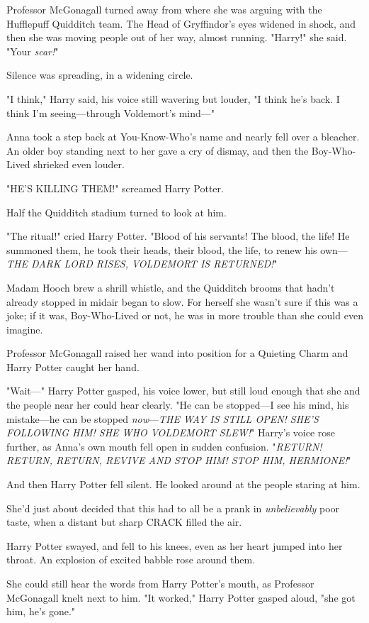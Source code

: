 Professor McGonagall turned away from where she was arguing with the Hufflepuff
Quidditch team. The Head of Gryffindor's eyes widened in shock, and then she
was moving people out of her way, almost running. "Harry!" she said. "Your
\emph{scar!}"

Silence was spreading, in a widening circle.

"I think," Harry said, his voice still wavering but louder, "I think he's back.
I think I'm seeing---through Voldemort's mind---"

Anna took a step back at You-Know-Who's name and nearly fell over a bleacher.
An older boy standing next to her gave a cry of dismay, and then the
Boy-Who-Lived shrieked even louder.

"HE'S KILLING THEM!" screamed Harry Potter.

Half the Quidditch stadium turned to look at him.

"The ritual!" cried Harry Potter. "Blood of his servants! The blood, the life!
He summoned them, he took their heads, their blood, the life, to renew his
own---\emph{THE DARK LORD RISES, VOLDEMORT IS RETURNED!}"

Madam Hooch brew a shrill whistle, and the Quidditch brooms that hadn't already
stopped in midair began to slow. For herself she wasn't sure if this was a
joke; if it was, Boy-Who-Lived or not, he was in more trouble than she could
even imagine.

Professor McGonagall raised her wand into position for a Quieting Charm and
Harry Potter caught her hand.

"Wait---" Harry Potter gasped, his voice lower, but still loud enough that she
and the people near her could hear clearly. "He can be stopped---I see his
mind, his mistake---he can be stopped \emph{now}---\emph{THE WAY IS STILL OPEN!
SHE'S FOLLOWING HIM! SHE WHO VOLDEMORT SLEW!}" Harry's voice rose further, as
Anna's own mouth fell open in sudden confusion. "\emph{RETURN! RETURN, RETURN,
REVIVE AND STOP HIM! STOP HIM, HERMIONE!}"

And then Harry Potter fell silent. He looked around at the people staring at
him.

She'd just about decided that this had to all be a prank in \emph{unbelievably}
poor taste, when a distant but sharp CRACK filled the air.

Harry Potter swayed, and fell to his knees, even as her heart jumped into her
throat. An explosion of excited babble rose around them.

She could still hear the words from Harry Potter's mouth, as Professor
McGonagall knelt next to him. "It worked," Harry Potter gasped aloud, "she got
him, he's gone."

